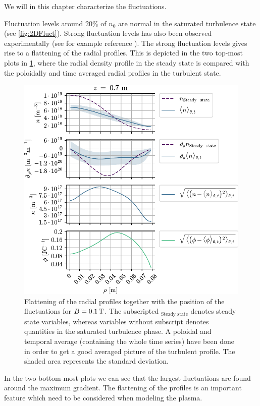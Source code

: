 We will in this chapter characterize the fluctuations.

Fluctuation levels around $20\%$ of $n_0$ are normal in the saturated turbulence state (see \cref{fig:2DFluct}).
Strong fluctuation levels has also been observed experimentally (see for example reference \cite{Burin2005}).
The strong fluctuation levels gives rise to a flattening of the radial profiles.
This is depicted in the two top-most plots in \cref{fig:posOfFluct01}, where the radial density profile in the steady state is compared with the poloidally and time averaged radial profiles in the turbulent state.
%
\begin{figure}[h!]
    \begin{center}
        \includegraphics{fig/results/posOfFluct/posOfFluctB01}
    \end{center}
    \caption{Flattening of the radial profiles together with the position of the fluctuations for $B=0.1\, \text{T}$.
        The subscripted $_\text{Steady state}$ denotes steady state variables, whereas variables without subscript denotes quantities in the saturated turbulence phase.
        A poloidal and temporal average (containing the whole time series) have been done in order to get a good averaged picture of the turbulent profile.
        The shaded area represents the standard deviation.
    }
    \label{fig:posOfFluct01}
\end{figure}
%
In the two bottom-most plots we can see that the largest fluctuations are found around the maximum gradient.
The flattening of the profiles is an important feature which need to be considered when modeling the plasma.

